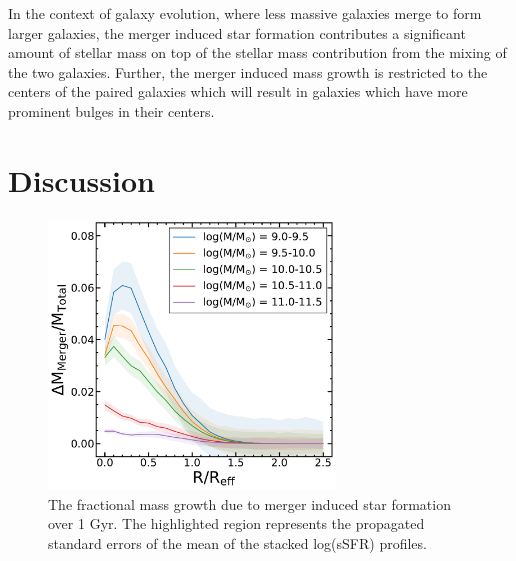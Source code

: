\documentclass[iop,revtex4,twocolumn,apj,numberedappendix,appendixfloats]{emulateapj}
\newcommand{\logm}{log({\it M}/M$_{\odot}$)}
\begin{document}

In the context of galaxy evolution, where less massive galaxies merge to form larger galaxies, the merger induced star formation contributes a significant amount of stellar mass on top of the stellar mass contribution from the mixing of the two galaxies. Further, the merger induced mass growth is restricted to the centers of the paired galaxies which will result in galaxies which have more prominent bulges in their centers.  

\section{Discussion}\label{sec:disc}
\begin{figure}
\centering
\includegraphics[width=3in]{fig/mass_gain.pdf}
\caption[The fractional mass gain due to merger induced star formation.]{The fractional mass growth due to merger induced star formation over 1 Gyr. The highlighted region represents the propagated standard errors of the mean of the stacked log(sSFR) profiles. }
\label{fig:mass_gain_sum}
\end{figure}
\end{document}
